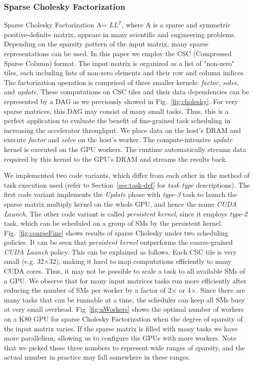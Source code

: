 \subsubsection{Sparse Cholesky Factorization}
Sparse Cholesky Factorization A= $LL^T$, where A is a sparse and symmetric positive-definite matrix,
appears in many scientific and engineering problems.
Depending on the sparsity pattern of the input matrix, many sparse representations can be used.
In this paper we employ the CSC (Compressed Sparse Column) format. 
The input matrix is organized as a list of "non-zero" tiles, each including lists of non-zero elements and their row and column indices.
The factorization operation is comprised of three smaller kernels: {\em factor}, {\em solve}, and {\em update}.
These computations on CSC tiles and their data dependencies can be represented by a DAG as we previously showed in Fig.~\ref{fig:cholesky}. 
For very sparse matrices, this DAG may consist of many small tasks.
Thus, this is a perfect application to evaluate the benefit of fine-grained task scheduling in increasing the accelerator throughput.
We place data on the host's DRAM and execute {\em factor} and {\em solve} on the host's worker.
The compute-intensive {\em update} kernel is executed on the GPU workers.
The runtime automatically streams data required by this kernel to the GPU's DRAM and streams the results back.

We implemented two code variants, which differ from each other in the method of task execution used (refer to Section~\ref{sec:task-def} for {\em task type} descriptions).
The first code variant implements the {\em Update} phase with {\em type-3} task to launch the sparse matrix multiply kernel on the whole GPU, and hence the name {\em CUDA Launch}.
The other code variant is called {\em persistent kernel}, since it employs {\em type-2} task, which can be scheduled on a group of SMs by the persistent kernel.
Fig.~\ref{fig:coarseFine} shows results of sparse Cholesky under two scheduling policies.
It can be seen that {\em persistent kernel} outperforms the coarse-grained {\em CUDA Launch} policy.
This can be explained as follows.
Each CSC tile is very small (e.g. 32$\times$32), making it hard to map computations efficiently to many CUDA cores.
Thus, it may not be possible to scale a task to all available SMs of a GPU.
We observe that for many input matrices tasks run more efficiently after reducing the number of SMs per worker by a factor of 2$\times$ or 4$\times$.
Since there are many tasks that can be runnable at a time, the scheduler can keep all SMs busy at very small overhead.
Fig~\ref{fig:nWorkers} shows the optimal number of workers on a K80 GPU for sparse Cholesky Factorization when the degree of sparsity of the input matrix varies.
If the sparse matrix is filled with many tasks we have more parallelism, allowing us to configure the GPUs with more workers.
Note that we picked these three numbers to represent wide ranges of sparsity, and the actual number in practice may fall somewhere in these ranges. 



